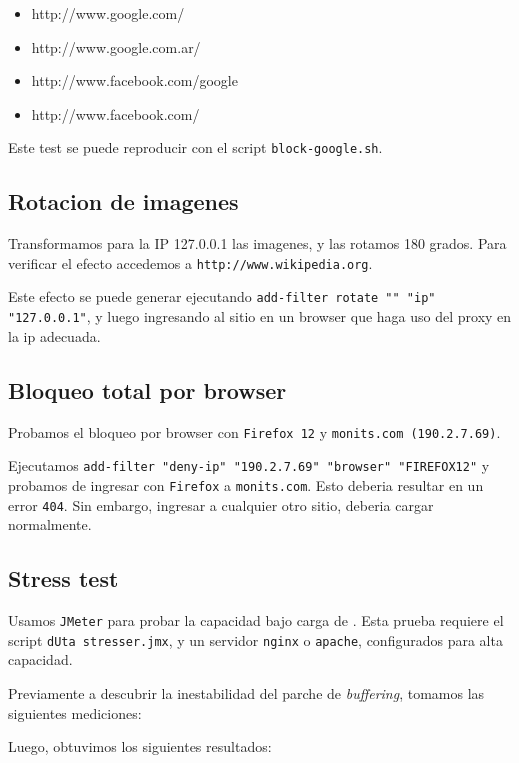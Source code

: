 \documentclass[11pt,a4paper,titlepage]{article}
\begin{document}
    \begin{itemize}
        \item http://www.google.com/
        \item http://www.google.com.ar/
        \item http://www.facebook.com/google
        \item http://www.facebook.com/
    \end{itemize}

    Este test se puede reproducir con el script \texttt{block-google.sh}.

    \subsection{Rotacion de imagenes}
    Transformamos para la IP 127.0.0.1 las imagenes, y las rotamos 180 grados.
    Para verificar el efecto accedemos a \texttt{http://www.wikipedia.org}.

    Este efecto se puede generar ejecutando \texttt{add-filter rotate "" "ip" "127.0.0.1"}, y luego ingresando al sitio en un browser que haga uso del proxy en la ip adecuada.

    \subsection{Bloqueo total por browser}
    Probamos el bloqueo por browser con \texttt{Firefox 12} y \texttt{monits.com (190.2.7.69)}.

    Ejecutamos \texttt{add-filter "deny-ip" "190.2.7.69" "browser" "FIREFOX12"} y probamos de ingresar con \texttt{Firefox} a \texttt{monits.com}.
    Esto deberia resultar en un error \texttt{404}.
    Sin embargo, ingresar a cualquier otro sitio, deberia cargar normalmente.

    \subsection{Stress test}
    Usamos \texttt{JMeter} para probar la capacidad bajo carga de \duta.
    Esta prueba requiere el script \texttt{dUta stresser.jmx}, y un servidor \texttt{nginx} o \texttt{apache}, configurados para alta capacidad.

    Previamente a descubrir la inestabilidad del parche de \textit{buffering}, tomamos las siguientes mediciones:


    Luego, obtuvimos los siguientes resultados:



\end{document}
